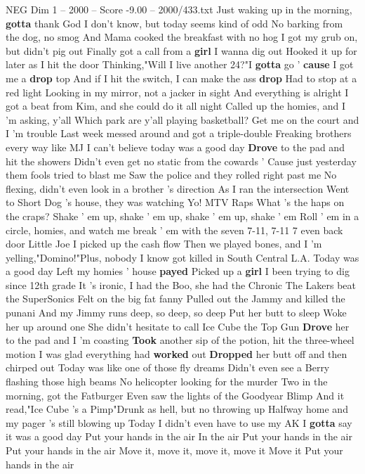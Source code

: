 \begin{textsample}{NEG Dim 1 – 2000 – Score -9.00 – 2000/433.txt}  \label{ex:f1_neg_009}
Just waking up in the morning, \textbf{gotta} thank God I don't know, but today seems kind of odd No barking from the dog, no smog And Mama cooked the breakfast with no hog I got my grub on, but didn't pig out Finally got a call from a \textbf{girl} I wanna dig out Hooked it up for later as I hit the door Thinking,"Will I live another 24?"I \textbf{gotta} go ' \textbf{cause} I got me a \textbf{drop} top And if I hit the switch, I can make the ass \textbf{drop} Had to stop at a red light Looking in my mirror, not a jacker in sight And everything is alright I got a beat from Kim, and she could do it all night Called up the homies, and I 'm asking, y'all Which park are y'all playing basketball?
Get me on the court and I 'm trouble Last week messed around and got a triple-double Freaking brothers every way like MJ I can't believe today was a good day \textbf{Drove} to the pad and hit the showers Didn't even get no static from the cowards ' Cause just yesterday them fools tried to blast me Saw the police and they rolled right past me No flexing, didn't even look in a brother 's direction As I ran the intersection Went to Short Dog 's house, they was watching Yo!
MTV Raps What 's the haps on the craps?
Shake ' em up, shake ' em up, shake ' em up, shake ' em Roll ' em in a circle, homies, and watch me break ' em with the seven 7-11, 7-11 7 even back door Little Joe I picked up the cash flow Then we played bones, and I 'm yelling,"Domino!"Plus, nobody I know got killed in South Central L.A.
Today was a good day Left my homies ' house \textbf{payed} Picked up a \textbf{girl} I been trying to dig since 12th grade It 's ironic, I had the Boo, she had the Chronic The Lakers beat the SuperSonics Felt on the big fat fanny Pulled out the Jammy and killed the punani And my Jimmy runs deep, so deep, so deep Put her butt to sleep Woke her up around one She didn't hesitate to call Ice Cube the Top Gun \textbf{Drove} her to the pad and I 'm coasting \textbf{Took} another sip of the potion, hit the three-wheel motion I was glad everything had \textbf{worked} out \textbf{Dropped} her butt off and then chirped out Today was like one of those fly dreams Didn't even see a Berry flashing those high beams No helicopter looking for the murder Two in the morning, got the Fatburger Even saw the lights of the Goodyear Blimp And it read,"Ice Cube 's a Pimp"Drunk as hell, but no throwing up Halfway home and my pager 's still blowing up Today I didn't even have to use my AK I \textbf{gotta} say it was a good day Put your hands in the air In the air Put your hands in the air Put your hands in the air Move it, move it, move it, move it Move it Put your hands in the air

\end{textsample}
